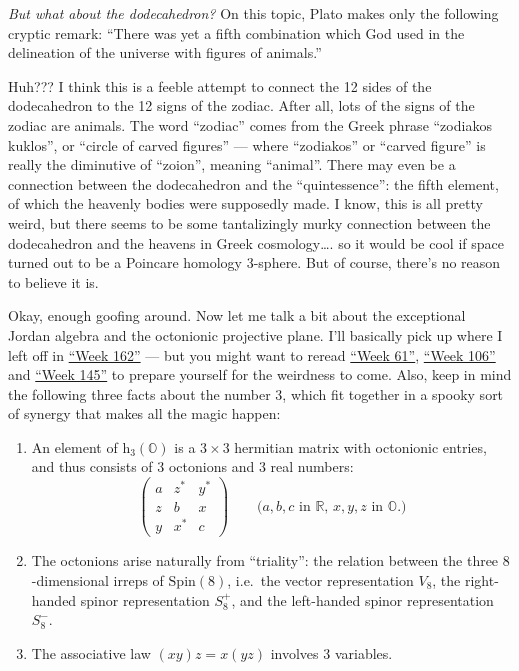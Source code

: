 \documentclass{article}
\begin{document}
\emph{But what about the dodecahedron?} On this topic, Plato makes only
the following cryptic remark: ``There was yet a fifth combination which
God used in the delineation of the universe with figures of animals.''

Huh??? I think this is a feeble attempt to connect the 12 sides of the
dodecahedron to the 12 signs of the zodiac. After all, lots of the signs
of the zodiac are animals. The word ``zodiac'' comes from the Greek
phrase ``zodiakos kuklos'', or ``circle of carved figures'' --- where
``zodiakos'' or ``carved figure'' is really the diminutive of ``zoion'',
meaning ``animal''. There may even be a connection between the
dodecahedron and the ``quintessence'': the fifth element, of which the
heavenly bodies were supposedly made. I know, this is all pretty weird,
but there seems to be some tantalizingly murky connection between the
dodecahedron and the heavens in Greek cosmology\ldots. so it would be
cool if space turned out to be a Poincare homology 3-sphere. But of
course, there's no reason to believe it is.

Okay, enough goofing around. Now let me talk a bit about the exceptional
Jordan algebra and the octonionic projective plane. I'll basically pick
up where I left off in \protect\hyperlink{week162}{``Week 162''} --- but
you might want to reread \protect\hyperlink{week61}{``Week 61''},
\protect\hyperlink{week106}{``Week 106''} and
\protect\hyperlink{week145}{``Week 145''} to prepare yourself for the
weirdness to come. Also, keep in mind the following three facts about
the number 3, which fit together in a spooky sort of synergy that makes
all the magic happen:

\begin{enumerate}
\def\labelenumi{\roman{enumi})}
\item
  An element of \(\mathrm{h}_3(\mathbb{O})\) is a \(3\times3\) hermitian
  matrix with octonionic entries, and thus consists of 3 octonions and 3
  real numbers: \[
     \left(
       \begin{array}{ccc}
         a&z^*&y^*
       \\z&b&x
       \\y&x^*&c
       \end{array}
     \right)
     \qquad\mbox{($a,b,c$ in $\mathbb{R}$, $x,y,z$ in $\mathbb{O}$.)}
   \]
\item
  The octonions arise naturally from ``triality'': the relation between
  the three \(8\)-dimensional irreps of \(\mathrm{Spin}(8)\), i.e.~the
  vector representation \(V_8\), the right-handed spinor representation
  \(S_8^+\), and the left-handed spinor representation \(S_8^-\).
\item
  The associative law \((xy)z = x(yz)\) involves 3 variables.
\end{enumerate}
\end{document}
